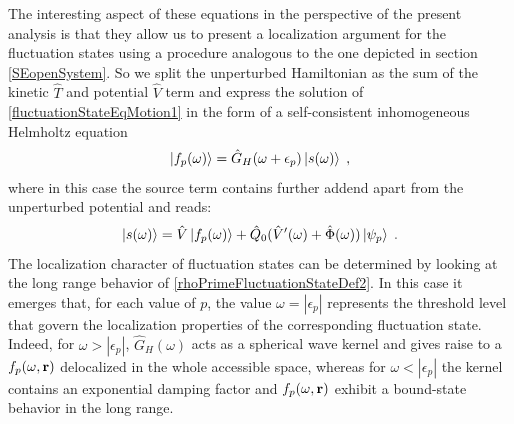 \documentclass[reprint,aps,prb]{revtex4-1}
\renewcommand{\r}{{\bf r}}
\newcommand{\eps}{\epsilon}
\newcommand{\ii}{\mathrm{i}}
\newcommand{\be}{\begin{equation}}
\newcommand{\ee}{\end{equation}}
\newcommand{\nn}{\notag}
\newcommand{\lb}{\label}
\newcommand{\op}[1]{\hat {#1}}
\begin{document}
The interesting aspect of these equations in the perspective of the present analysis is that they allow us to present a localization argument for the fluctuation states using a procedure  
analogous to the one depicted in section \ref{SEopenSystem}. So we split the unperturbed Hamiltonian as the sum of the kinetic $\op T$ and potential $\op V$ term and express the solution of 
\eqref{fluctuationStateEqMotion1} in the form of a self-consistent inhomogeneous Helmholtz equation
\be\lb{rhoPrimeFluctuationStateDef2}
\ket{f_p(\omega)} = \op G_H(\omega+\epsilon_p)\ket{s(\omega)} \;,
\ee
where in this case the source term contains further addend apart from the unperturbed potential and reads:
\be
\ket{s(\omega)} =  \op V\ket{f_p(\omega)} + \op Q_0(\op V'(\omega) + \op \Phi(\omega))\ket{\psi_p} \;.\nn
\ee
The localization character of fluctuation states can be determined by looking at the long range behavior of \eqref{rhoPrimeFluctuationStateDef2}.
In this case it emerges that, for each value of $p$, the value $\omega = |\eps_p|$ represents the threshold level that govern the localization properties of the corresponding 
fluctuation state. Indeed, for $\omega > |\eps_p|$,  $\op G_H(\omega)$ acts as a spherical wave kernel and  gives raise to a $f_p(\omega,\r)$ delocalized in the whole accessible space,
whereas for $\omega < |\eps_p|$ the kernel contains an exponential damping factor and $f_p(\omega,\r)$ exhibit a bound-state behavior in the long range.   

\end{document}
